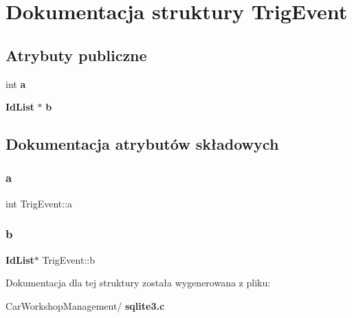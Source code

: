 \section{Dokumentacja struktury Trig\+Event}
\label{struct_trig_event}
\subsection*{Atrybuty publiczne}
\begin{DoxyCompactItemize}
\item 
int \textbf{ a}
\item 
\textbf{ Id\+List} $\ast$ \textbf{ b}
\end{DoxyCompactItemize}


\subsection{Dokumentacja atrybutów składowych}
\mbox{\label{struct_trig_event_a19ac5a5e59e08350f72ec49cf8fccbb6}} 
\subsubsection{a}
{\footnotesize\ttfamily int Trig\+Event\+::a}

\mbox{\label{struct_trig_event_a86ef160cde95382e98b7934614e7f79f}} 
\subsubsection{b}
{\footnotesize\ttfamily \textbf{ Id\+List}$\ast$ Trig\+Event\+::b}



Dokumentacja dla tej struktury została wygenerowana z pliku\+:\begin{DoxyCompactItemize}
\item 
Car\+Workshop\+Management/\textbf{ sqlite3.\+c}\end{DoxyCompactItemize}
